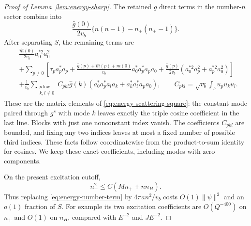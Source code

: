 \begin{proof}[Proof of Lemma~\ref{lem:energy-sharp}]
The retained $g$ direct terms in the number-$n$ sector combine into
\begin{equation}\label{eq:energy-number-term}
 \frac{\widehat g(0)}{2v_b}
            \{n(n-1)-n_+(n_+-1)\}.
\end{equation}
After separating $S$, the remaining terms are
\begin{equation}\label{eq:energy-retained-hamiltonian}
\begin{split}
 &\frac{\widehat m(0)}{2v_b}a_0^{*2}a_0^2\\
 &+\sum_{p\ne0}\left[
  \tau_pa_p^*a_p+
  \frac{\widehat g(p)+\widehat m(p)+\widehat m(0)}{v_b}
                           a_0^*a_p^*a_pa_0
  +\frac{\widehat g(p)}{2v_b}(a_0^{*2}a_p^2+a_p^{*2}a_0^2)\right]\\
 &+\frac1{v_b}\sum_{\substack{p\ \text{low}\\ k,l\ne0}}
 C_{pkl}\widehat g(k)
                (a_0^*a_p^*a_la_k+a_k^*a_l^*a_pa_0),
 \qquad C_{pkl}=\sqrt{v_b}\int_bu_pu_ku_l.
\end{split}
\end{equation}
These are the matrix elements of
\eqref{eq:energy-scattering-square}: the constant mode paired through
$g^s$ with mode $k$ leaves exactly the triple cosine coefficient in the
last line.  Blocks with just one nonconstant index vanish.  The
coefficients $C_{pkl}$ are bounded, and fixing any two indices leaves at
most a fixed number of possible third indices.  These facts follow
coordinatewise from the product-to-sum identity for cosines.  We keep
these exact coefficients, including modes with zero components.

On the present excitation cutoff,
\begin{equation}\label{eq:energy-number-square}
 n_+^2\le C(Mn_++nn_H).
\end{equation}
Thus replacing \eqref{eq:energy-number-term} by $4\pi an^2/v_b$ costs
$O(1)\|\psi\|^2$ and an $o(1)$ fraction of $S$.
For example its two excitation coefficients are $O(Q^{-400})$ on
$n_+$ and $O(1)$ on $n_H$, compared with $E^{-2}$ and $JE^{-2}$.


\end{proof}
